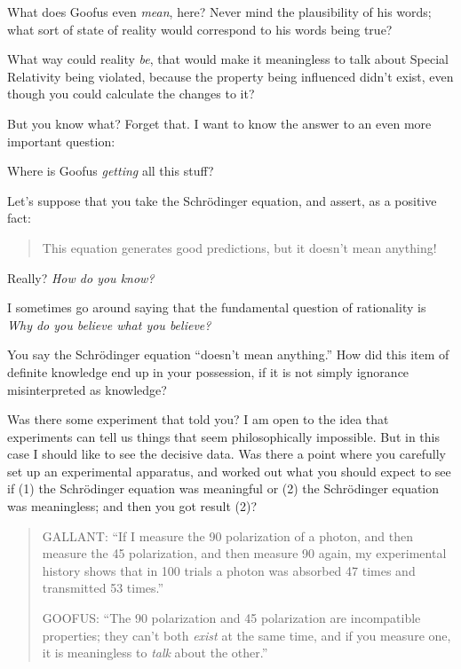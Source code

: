 {
 What does Goofus even \textit{mean}, here? Never mind the
plausibility of his words; what sort of state of reality would
correspond to his words being true?}

{
 What way could reality \textit{be}, that would make it meaningless
to talk about Special Relativity being violated, because the property
being influenced didn't exist, even though you could
calculate the changes to it?}

{
 But you know what? Forget that. I want to know the answer to an
even more important question:}

{
 Where is Goofus \textit{getting} all this stuff?}

{
 Let's suppose that you take the Schrödinger
equation, and assert, as a positive fact:}

\begin{quote}
{
 This equation generates good predictions, but it
 doesn't mean anything!}
\end{quote}

{
 Really? \textit{How do you know?}}

{
 I sometimes go around saying that the fundamental question of
rationality is \textit{Why do you believe what you believe?}}

{
 You say the Schrödinger equation
``doesn't mean
anything.'' How did this item of definite knowledge
end up in your possession, if it is not simply ignorance misinterpreted
as knowledge?}

{
 Was there some experiment that told you? I am open to the idea
that experiments can tell us things that seem philosophically
impossible. But in this case I should like to see the decisive data.
Was there a point where you carefully set up an experimental apparatus,
and worked out what you should expect to see if (1) the Schrödinger
equation was meaningful or (2) the Schrödinger equation was
meaningless; and then you got result (2)?}

\begin{quotation}
{
 GALLANT: ``If I measure the 90\degree{}
polarization of a photon, and then measure the 45\degree{}
polarization, and then measure 90\degree{} again, my
experimental history shows that in 100 trials a photon was absorbed 47
times and transmitted 53 times.''}

{
 GOOFUS: ``The 90\degree{} polarization
and 45\degree{} polarization are incompatible properties;
they can't both \textit{exist} at the same time, and if
you measure one, it is meaningless to \textit{talk} about the
other.''}
\end{quotation}


